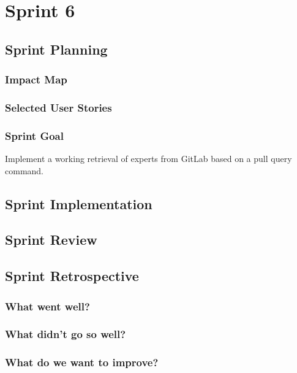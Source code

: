 \section{Sprint 6}

\subsection{Sprint Planning}

\subsubsection{Impact Map}

\begin{figure}[h!]
	
\end{figure}

\subsubsection{Selected User Stories}

\subsubsection{Sprint Goal}

Implement a working retrieval of experts from GitLab based on a pull query command.

\subsection{Sprint Implementation}

\subsection{Sprint Review}

\subsection{Sprint Retrospective}

\subsubsection{What went well?}

\subsubsection{What didn't go so well?}

\subsubsection{What do we want to improve?}